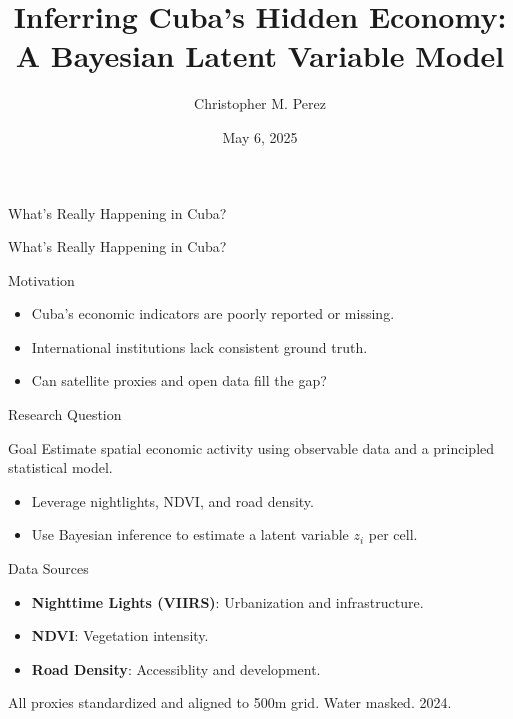 \documentclass{beamer}
\title{Inferring Cuba's Hidden Economy: A Bayesian Latent Variable Model}
\author{Christopher M. Perez}
\date{May 6, 2025}
\begin{document}
\begin{frame}
  \titlepage
\end{frame}

\begin{frame}{What's Really Happening in Cuba?}
  \centering
   \\[1em]
\end{frame}

\begin{frame}{What's Really Happening in Cuba?}
  \centering
\end{frame}


\begin{frame}{Motivation}
  \begin{itemize}
    \item Cuba's economic indicators are poorly reported or missing.
    \item International institutions lack consistent ground truth.
    \item Can satellite proxies and open data fill the gap?
  \end{itemize}
\end{frame}

  
\begin{frame}{Research Question}
  \begin{block}{Goal}
  Estimate spatial economic activity using observable data and a principled statistical model.
  \end{block}
  \pause
  \begin{itemize}
    \item Leverage nightlights, NDVI, and road density.
    \item Use Bayesian inference to estimate a latent variable $z_i$ per cell.
  \end{itemize}
  \end{frame}
  
\begin{frame}{Data Sources}
\begin{itemize}
    \item \textbf{Nighttime Lights (VIIRS)}: Urbanization and infrastructure.
    \item \textbf{NDVI}: Vegetation intensity.
  \item \textbf{Road Density}: Accessiblity and development.
\end{itemize}
\pause
All proxies standardized and aligned to 500m grid. Water masked. 2024.
\end{frame}
\end{document}
